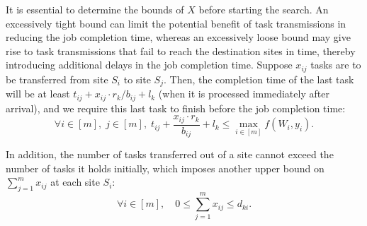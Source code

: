 It is essential to determine the bounds of $X$ before starting the search. 
An excessively tight bound can limit the potential benefit of task transmissions in reducing the job completion time, whereas an excessively loose bound may give rise to task transmissions that fail to reach the destination sites in time, thereby introducing additional delays in the job completion time. %
Suppose $x_{ij}$ tasks are to be transferred from site $S_i$ to site $S_j$. Then, the completion time of the last task will be at least $t_{ij} + x_{ij}\cdot r_k/b_{ij} + l_k$ (when it is processed immediately after arrival), and we require this last task to finish before the job completion time:
\begin{equation}
\forall i \in [m], \; j \in [m], \;
t_{ij} + \frac{x_{ij} \cdot r_k}{b_{ij}} + l_k
\le \max_{i \in [m]} f(W_i,y_i).
\label{eq:constraint_t}
\end{equation}

In addition, the number of tasks transferred out of a site cannot exceed the number of tasks it holds initially, which imposes another upper bound on $\sum_{j=1}^m x_{ij}$ at each site $S_i$:
\begin{equation}
    \forall i \in [m], \quad 0 \leq \sum_{j=1}^m x_{ij} \leq d_{ki}.
\label{eq:constraint_sum}
\end{equation}

